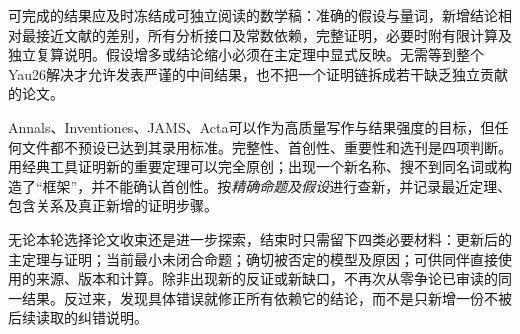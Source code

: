 \documentclass[UTF8,a4paper,11pt,fontset=fandol]{ctexart}
\numberwithin{equation}{section}
\theoremstyle{definition}
\begin{document}
可完成的结果应及时冻结成可独立阅读的数学稿：准确的假设与量词，新增结论相对最接近文献的差别，所有分析接口及常数依赖，完整证明，必要时附有限计算及独立复算说明。假设增多或结论缩小必须在主定理中显式反映。无需等到整个Yau26解决才允许发表严谨的中间结果，也不把一个证明链拆成若干缺乏独立贡献的论文。

Annals、Inventiones、JAMS、Acta可以作为高质量写作与结果强度的目标，但任何文件都不预设已达到其录用标准。完整性、首创性、重要性和选刊是四项判断。用经典工具证明新的重要定理可以完全原创；出现一个新名称、搜不到同名词或构造了“框架”，并不能确认首创性。按\emph{精确命题及假设}进行查新，并记录最近定理、包含关系及真正新增的证明步骤。

无论本轮选择论文收束还是进一步探索，结束时只需留下四类必要材料：更新后的主定理与证明；当前最小未闭合命题；确切被否定的模型及原因；可供同伴直接使用的来源、版本和计算。除非出现新的反证或新缺口，不再次从零争论已审读的同一结果。反过来，发现具体错误就修正所有依赖它的结论，而不是只新增一份不被后续读取的纠错说明。
\end{document}
